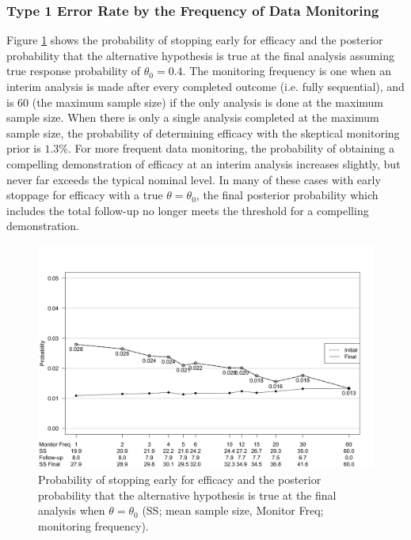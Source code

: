 \documentclass[AMA,STIX1COL,doublespace]{WileyNJD-v2}
\begin{document}
\subsubsection{Type 1 Error Rate by the Frequency of Data Monitoring}\label{sec:ex1t1e}
Figure \ref{fig:ex1t1e} shows the probability of stopping early for efficacy and the posterior probability that the alternative hypothesis is true at the final analysis assuming true response probability of $\theta_0=0.4$. 
%
The monitoring frequency is one when an interim analysis is made after every completed outcome (i.e. fully sequential), and is 60 (the maximum sample size) if the only analysis is done at the maximum sample size.
%
When there is only a single analysis completed at the maximum sample size, the probability of determining efficacy with the skeptical monitoring prior is $1.3\%$.
%
%
%
For more frequent data monitoring, the probability of obtaining a compelling demonstration of efficacy at an interim analysis increases slightly, but never far exceeds the typical nominal level. 
%
In many of these cases with early stoppage for efficacy with a true $\theta=\theta_0$, the final posterior probability which includes the total follow-up no longer meets the threshold for a compelling demonstration.
\begin{figure}
\begin{center}

    \includegraphics[width=6in]{figure4.png}
    \caption{Probability of stopping early for efficacy and the posterior probability that the alternative hypothesis is true at the final analysis when $\theta=\theta_0$ (SS; mean sample size, Monitor Freq; monitoring frequency).}
	\label{fig:ex1t1e}

 
\end{center}
\end{figure}
\end{document}
